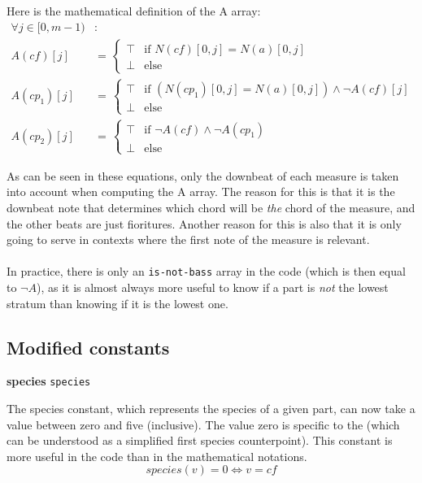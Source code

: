 Here is the mathematical definition of the A array:
\begin{equation}
\begin{aligned}
\forall j \in [0, m-1)& \colon  \\
A(cf)[j] &= \,  
\begin{cases}
    \top & \text{if } N(cf)[0,j] = N(a)[0,j] \\
    \bot & \text{else }
\end{cases}\\
A(cp_1)[j] &= \,  
\begin{cases}
    \top & \text{if } (N(cp_1)[0,j] = N(a)[0,j]) \land \neg A(cf)[j] \\
    \bot & \text{else }
\end{cases}\\
A(cp_2)[j] &= \,  
\begin{cases}
    \top & \text{if } \neg A(cf) \land \neg A(cp_1)\\
    \bot & \text{else }
\end{cases}
\end{aligned}
\end{equation}

As can be seen in these equations, only the downbeat of each measure is taken into account when computing the A array. The reason for this is that it is the downbeat note that determines which chord will be \textit{the} chord of the measure, and the other beats are just fioritures. Another reason for this is also that it is only going to serve in contexts where the first note of the measure is relevant.

\paragraph{}
In practice, there is only an \texttt{is-not-bass} array in the code (which is then equal to $\neg A$), as it is almost always more useful to know if a part is \textit{not} the lowest stratum than knowing if it is the lowest one. 

\subsection{Modified constants} \label{subsection:modified_constants}
\noindent \textbf{species} \hspace{.2cm} \texttt{species} 

The species constant, which represents the species of a given part, can now take a value between zero and five (inclusive). The value zero is specific to the \cfs (which can be understood as a simplified first species counterpoint). This constant is more useful in the code than in the mathematical notations.
\begin{equation}
species(v) = 0 \iff v = cf
\end{equation}

